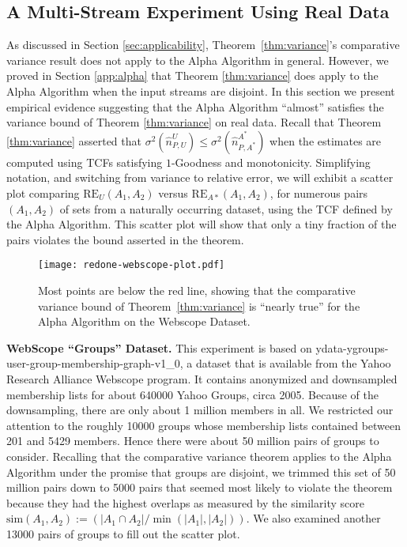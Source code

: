 \documentclass{article}
\begin{document}
\subsection{A Multi-Stream Experiment Using Real Data}
\label{sec:webscope-experiment}
\label{app:webscope-experiment}
As discussed in Section \ref{sec:applicability}, Theorem~\ref{thm:variance}'s comparative
variance result does not apply to the Alpha Algorithm in general. However, 
we proved in Section \ref{app:alpha} that Theorem \ref{thm:variance} does apply to the Alpha Algorithm when the
input streams are disjoint. In this section we present empirical
evidence suggesting that the Alpha Algorithm ``almost'' satisfies the variance bound of Theorem \ref{thm:variance} on real
data. Recall that Theorem \ref{thm:variance} asserted that $\sigma^2(\hat{n}^U_{P,U}) \le                                                      
\sigma^2(\hat{n}^{A^*}_{P,A^*})$ when the estimates are computed using TCFs satisfying $1$-Goodness and monotonicity. 
Simplifying notation, and switching
from variance to relative error, we will exhibit a scatter plot
comparing $\mathrm{RE}_U(A_1,A_2)$ versus $\mathrm{RE}_{A*}(A_1,A_2)$,
for numerous pairs $(A_1,A_2)$ of sets from a naturally occurring
dataset, using the TCF defined by the Alpha Algorithm. This scatter plot will show that only a tiny fraction of the
pairs violates the bound asserted in the theorem.

\begin{figure}
\begin{center}
\texttt{[image: redone-webscope-plot.pdf]}
\end{center}
\caption{Most points are below the red line, showing that the
comparative variance bound of Theorem~\ref{thm:variance} is ``nearly true'' for the Alpha Algorithm on the Webscope
Dataset.}
\label{fig:webscope-groups-scatter}
\end{figure}

\noindent \textbf{WebScope ``Groups'' Dataset.}
This experiment is based on
ydata-ygroups-user-group-membership-graph-v1\_0, a dataset that is
available from the Yahoo Research Alliance Webscope program.  It
contains anonymized and downsampled membership lists for about 640000
Yahoo Groups, circa 2005. Because of the downsampling, there are only
about 1 million members in all. We restricted our attention to the
roughly 10000 groups whose membership lists contained between 201 and
5429 members. Hence there were about 50 million pairs of groups to
consider.  Recalling that the comparative variance theorem applies to the Alpha Algorithm
under the promise that groups are disjoint, we trimmed this set of 50 million
pairs down to 5000 pairs that seemed most likely to violate the 
theorem because they had the highest overlaps as measured by the similarity score 
$\textrm{sim}(A_1,A_2) := (|A_1 \cap A_2| / \min (|A_1|,|A_2|))$.
We also examined another 13000 pairs of groups to fill out the 
scatter plot.                                                                                      
\end{document}
